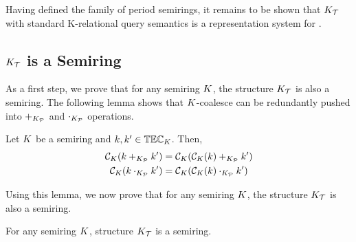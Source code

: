 Having defined the family of period semirings, it remains to be shown that $K_{\mathcal{T}}$ with standard K-relational query semantics is a representation system for \SKrels{}.


\subsection{$K_{\mathcal{T}}$ is a Semiring}
\label{sec:semtimeni-semiring}

As a first step, we prove that for any semiring $K$, the structure $K_{\mathcal{T}}$ is  also  a semiring.
 The following lemma shows that $K$-coalesce can be redundantly pushed into $+_{K_{\mathcal{P}}}$ and $\cdot_{K_{\mathcal{P}}}$ operations.

\begin{lem}\label{lem:coalesce-push}
  Let $K$ be a semiring and $k, k' \in \mathbb{TEC}_{{K}}$. Then,
     \begin{align*}
     \mathcal{C}_{{K}}(k +_{K_{\mathcal{P}}} k') &= \mathcal{C}_{{K}}(\mathcal{C}_{{K}}(k) +_{K_{\mathcal{P}}} k') \\
       \mathcal{C}_{{K}}(k \cdot_{K_{\mathcal{P}}} k')
      &= \mathcal{C}_{{K}}(\mathcal{C}_{{K}}(k) \cdot_{K_{\mathcal{P}}} k')
   \end{align*}
\end{lem}

Using this lemma, we now prove that for any semiring $K$, the structure $K_{\mathcal{T}}$ is also a semiring.

\begin{theo}\label{theo:timeib-is-semiring}
For any semiring $K$, structure $K_{\mathcal{T}}$ is a semiring.
\end{theo}



